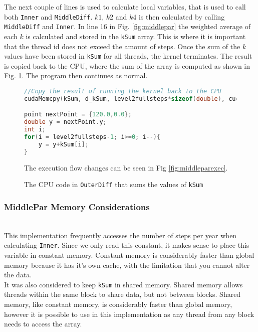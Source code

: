 The next couple of lines is used to calculate local variables, that is used to call both \texttt{Inner} and \texttt{MiddleDiff}. $k1$, $k2$ and $k4$ is then calculated by calling \texttt{MiddleDiff} and \texttt{Inner}. In line 16 in Fig. \ref{fig:middlepar} the weighted average of each $k$ is calculated and stored in the \texttt{kSum} array. This is where it is important that the thread id does not exceed the amount of steps. Once the sum of the $k$ values have been stored in \texttt{kSum} for all threads, the kernel terminates. The result is copied back to the CPU, where the sum of the array is computed as shown in Fig. \ref{fig:middleparcpu}. The program then continues as normal.

\begin{figure}[H]
\begin{lstlisting}[language=c]
//Copy the result of running the kernel back to the CPU
cudaMemcpy(kSum, d_kSum, level2fullsteps*sizeof(double), cudaMemcpyDeviceToHost);

point nextPoint = {120.0,0.0};
double y = nextPoint.y;
int i;
for(i = level2fullsteps-1; i>=0; i--){
	y = y+kSum[i];
}
\end{lstlisting}

The execution flow changes can be seen in Fig \ref{fig:middleparexec}.
\caption{The CPU code in \texttt{OuterDiff} that sums the values of \texttt{kSum}}
\label{fig:middleparcpu}
\end{figure}

\subsubsection{MiddlePar Memory Considerations} \hfill \\
This implementation frequently accesses the number of steps per year when calculating \texttt{Inner}. Since we only read this constant, it makes sense to place this variable in constant memory. Constant memory is considerably faster than global memory\cite{bpg} because it has it's own cache, with the limitation that you cannot alter the data.\\

It was also considered to keep \texttt{kSum} in shared memory. Shared memory allows threads within the same block to share data, but not between blocks. Shared memory, like constant memory, is considerably faster than global memory, however it is possible to use in this implementation as any thread from any block needs to access the array.

